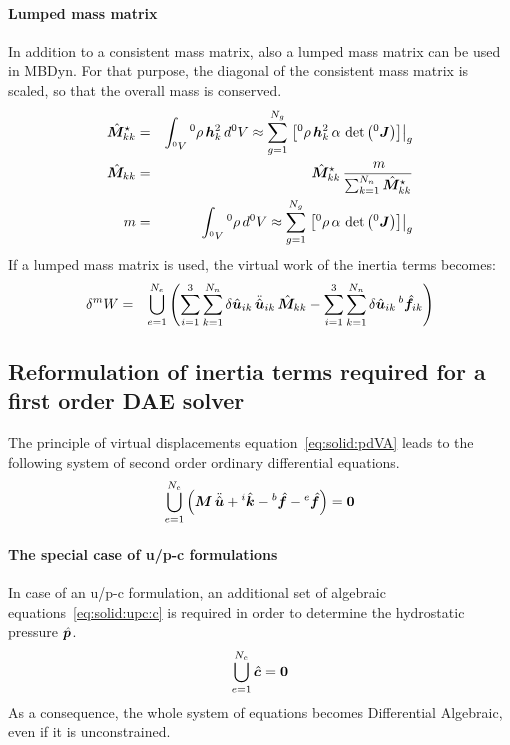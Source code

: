 \paragraph{Lumped mass matrix}
In addition to a consistent mass matrix, also a lumped mass matrix can be used in MBDyn.
For that purpose, the diagonal of the consistent mass matrix is scaled, so that the overall mass is conserved.
\begin{eqnarray}
\hat{\bm{M}}_{kk}^{\star} & = & \int_{^0V} {^0}\rho \, \bm{h}_k^2 \, d^0V \approx \sum_{g=1}^{N_g} \left.\left[{^0}\rho \, \bm{h}_k^2 \, \alpha \, \det{\left({^0}\bm{J}\right)}\right]\right\vert_{g} \\
\hat{\bm{M}}_{kk}&=&\hat{\bm{M}}_{kk}^{\star} \, \frac{\,m}{\sum_{k=1}^{N_n}\hat{\bm{M}}_{kk}^{\star}} \\
m&=&\int_{^0V}{^0}\rho\,d{^0V} \approx \sum_{g=1}^{N_g} \left.\left[{^0}\rho \, \alpha \, \det{\left(^0\bm{J}\right)}\right]\right\vert_{g}
\end{eqnarray}
If a lumped mass matrix is used, the virtual work of the inertia terms becomes:
\begin{eqnarray}
\delta^{m}W & = & \bigcup_{e=1}^{N_e}\left(\sum_{i=1}^3\sum_{k=1}^{N_n}\delta\hat{\bm{u}}_{ik} \, \ddot{\hat{\bm{u}}}_{ik} \, \hat{\bm{M}}_{kk}
 - \sum_{i=1}^3\sum_{k=1}^{N_n} \delta\hat{\bm{u}}_{ik} \, {^b}\hat{\bm{f}}_{ik}\right)
\end{eqnarray}

\subsection{Reformulation of inertia terms required for a first order DAE solver}
\label{sec:solid:global_eq}
The principle of virtual displacements equation~\ref{eq:solid:pdVA} leads to the following system of second order ordinary differential equations.
\begin{eqnarray}
\bigcup_{e=1}^{N_e} \left(\bm{M} \, \ddot{\hat{\bm{u}}} + {^i}\hat{\bm{k}} - {^b}\hat{\bm{f}} - {^e}\hat{\bm{f}}\right) = \bm{0} \label{eq:solid:global_eq1}
\end{eqnarray}
\paragraph{The special case of u/p-c formulations}
In case of an u/p-c formulation, an additional set of algebraic equations~\ref{eq:solid:upc:c} is required in order to determine the hydrostatic pressure $\hat{\bm{p}}$.
\begin{eqnarray}
\bigcup_{e=1}^{N_e} \hat{\bm{c}} = \bm{0} \label{eq:solid:global_eq1c}
\end{eqnarray}
As a consequence, the whole system of equations becomes Differential Algebraic, even if it is unconstrained.
